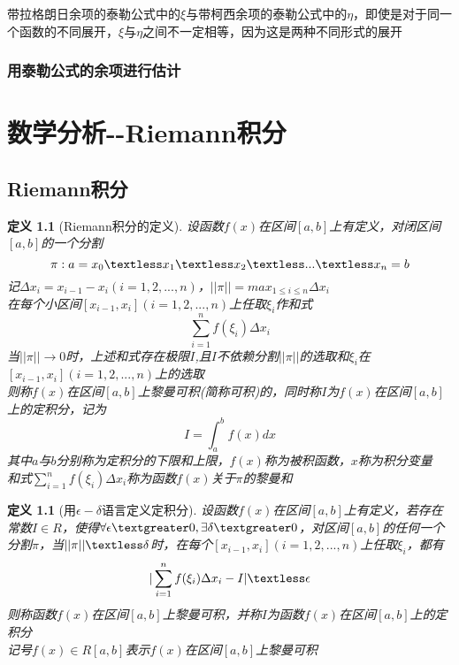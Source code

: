 \documentclass[12pt, a4paper, oneside]{ctexart}
\newtheorem{definition}[theorem]{定义}
\begin{document}
\begin{remark}
带拉格朗日余项的泰勒公式中的$\xi$与带柯西余项的泰勒公式中的$\eta$，即使是对于同一个函数的不同展开，$\xi$与$\eta$之间不一定相等，因为这是两种不同形式的展开
\end{remark}



\subsection{用泰勒公式的余项进行估计}
\newpage

\chapter{数学分析-\uppercase\expandafter{}-Riemann积分}

\section{Riemann积分}

\begin{definition}[Riemann积分的定义]
设函数$f(x)$在区间$[a,b]$上有定义，对闭区间$[a,b]$的一个分割
\begin{equation}
    \pi:a=x_0 \textless x_1 \textless x_2 \textless ... \textless x_n=b
\end{equation}
记$\Delta x_i=x_{i-1}-x_i(i=1,2,...,n)$，$||\pi||=max_{1 \leq i \leq n}{\Delta x_i}$\\
在每个小区间$[x_{i-1},x_i](i=1,2,...,n)$上任取$\xi_{i}$作和式
\begin{equation}
    \sum_{i=1}^{n}f(\xi_i)\Delta x_i
\end{equation}
当$||\pi|| \to 0$时，上述和式存在极限$I$,且$I$不依赖分割$||\pi||$的选取和$\xi_i$在$[x_{i-1},x_i](i=1,2,...,n)$上的选取\\
则称$f(x)$在区间$[a,b]$上黎曼可积(简称可积)的，同时称$I$为$f(x)$在区间$[a,b]$上的定积分，记为
\begin{equation}
    I=\int_{a}^{b}f(x)dx
\end{equation}
其中$a$与$b$分别称为定积分的下限和上限，$f(x)$称为被积函数，$x$称为积分变量\\
和式$ \sum_{i=1}^{n}f(\xi_i)\Delta x_i$称为函数$f(x)$关于$\pi$的黎曼和
\end{definition}

\begin{definition}[用$\epsilon - \delta$语言定义定积分]
设函数$f(x)$在区间$[a,b]$上有定义，若存在常数$I \in R$，使得$\forall \epsilon \textgreater 0,\exists \delta \textgreater 0$，对区间$[a,b]$的任何一个分割$\pi$，当$||\pi||  \textless \delta$时，在每个$[x_{i-1},x_i](i=1,2,...,n)$上任取$\xi_{i}$，都有
\begin{equation}
    |\sum_{i=1}^{n}f(\xi_i)\Delta x_i-I| \textless \epsilon
\end{equation}
则称函数$f(x)$在区间$[a,b]$上黎曼可积，并称$I$为函数$f(x)$在区间$[a,b]$上的定积分\\
记号$f(x) \in R[a,b]$表示$f(x)$在区间$[a,b]$上黎曼可积
\end{definition}
\end{document}
